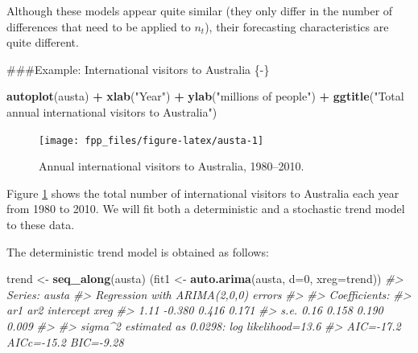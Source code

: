 \documentclass[]{book}
\newenvironment{Shaded}{\begin{snugshade}}{\end{snugshade}}
\newcommand{\CommentTok}[1]{\textcolor[rgb]{0.56,0.35,0.01}{\textit{#1}}}
\newcommand{\DataTypeTok}[1]{\textcolor[rgb]{0.13,0.29,0.53}{#1}}
\newcommand{\DecValTok}[1]{\textcolor[rgb]{0.00,0.00,0.81}{#1}}
\newcommand{\KeywordTok}[1]{\textcolor[rgb]{0.13,0.29,0.53}{\textbf{#1}}}
\newcommand{\NormalTok}[1]{#1}
\newcommand{\OperatorTok}[1]{\textcolor[rgb]{0.81,0.36,0.00}{\textbf{#1}}}
\newcommand{\StringTok}[1]{\textcolor[rgb]{0.31,0.60,0.02}{#1}}
\begin{document}
Although these models appear quite similar (they only differ in the number of differences that need to be applied to \(n_t\)), their forecasting characteristics are quite different.

\#\#\#Example: International visitors to Australia \{-\}

\begin{Shaded}
\begin{Highlighting}[]
\KeywordTok{autoplot}\NormalTok{(austa) }\OperatorTok{+}\StringTok{ }\KeywordTok{xlab}\NormalTok{(}\StringTok{"Year"}\NormalTok{) }\OperatorTok{+}
\StringTok{  }\KeywordTok{ylab}\NormalTok{(}\StringTok{"millions of people"}\NormalTok{) }\OperatorTok{+}
\StringTok{  }\KeywordTok{ggtitle}\NormalTok{(}\StringTok{"Total annual international visitors to Australia"}\NormalTok{)}
\end{Highlighting}
\end{Shaded}

\begin{figure}

{\centering \texttt{[image: fpp\_files/figure-latex/austa-1]} 

}

\caption{Annual international visitors to Australia, 1980--2010.}\label{fig:austa}
\end{figure}

Figure \ref{fig:austa} shows the total number of international visitors to Australia each year from 1980 to 2010. We will fit both a deterministic and a stochastic trend model to these data.

The deterministic trend model is obtained as follows:

\begin{Shaded}
\begin{Highlighting}[]
\NormalTok{trend <-}\StringTok{ }\KeywordTok{seq_along}\NormalTok{(austa)}
\NormalTok{(fit1 <-}\StringTok{ }\KeywordTok{auto.arima}\NormalTok{(austa, }\DataTypeTok{d=}\DecValTok{0}\NormalTok{, }\DataTypeTok{xreg=}\NormalTok{trend))}
\CommentTok{#> Series: austa }
\CommentTok{#> Regression with ARIMA(2,0,0) errors }
\CommentTok{#> }
\CommentTok{#> Coefficients:}
\CommentTok{#>        ar1     ar2  intercept   xreg}
\CommentTok{#>       1.11  -0.380      0.416  0.171}
\CommentTok{#> s.e.  0.16   0.158      0.190  0.009}
\CommentTok{#> }
\CommentTok{#> sigma^2 estimated as 0.0298:  log likelihood=13.6}
\CommentTok{#> AIC=-17.2   AICc=-15.2   BIC=-9.28}
\end{Highlighting}
\end{Shaded}
\end{document}
